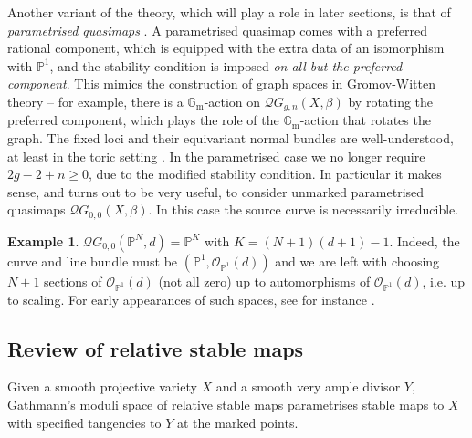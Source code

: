 \documentclass[11pt]{amsart}
\newcommand{\QG}[4]{\mathcal{Q}G_{#1,#2}(#3,#4)}
\newcommand{\PP}{\mathbb P}
\newcommand{\Gm}{\mathbb{G}_{\text{m}}}
\theoremstyle{definition}
\theoremstyle{definition}
\newtheorem{example}[thm]{Example}
\begin{document}
Another variant of the theory, which will play a role in later sections, is that of \emph{parametrised quasimaps} \cite[\S 7]{CF-K}. A parametrised quasimap comes with a preferred rational component, which is equipped with the extra data of an isomorphism with $\PP^1$, and the stability condition is imposed \emph{on all but the preferred component}. This mimics the construction of graph spaces in Gromov-Witten theory -- for example, there is a $\Gm$-action on $\QG{g}{n}{X}{\beta}$ by rotating the preferred component, which plays the role of the $\Gm$-action that rotates the graph. The fixed loci and their equivariant normal bundles are well-understood, at least in the toric setting \cite[\S 7]{CF-K}.  In the parametrised case we no longer require $2g-2+n\geq 0$, due to the modified stability condition. In particular it makes sense, and turns out to be very useful, to consider unmarked parametrised quasimaps $\QG{0}{0}{X}{\beta}$. In this case the source curve is necessarily irreducible. 

\begin{example} $\QG{0}{0}{\PP^N}{d} = \PP^K$ with $K=(N+1)(d+1)-1$. Indeed, the curve and line bundle must be $(\PP^1,\mathcal O_{\PP^1}(d))$ and we are left with choosing $N+1$ sections of $\mathcal O_{\PP^1}(d)$ (not all zero) up to automorphisms of $\mathcal O_{\PP^1}(d)$, i.e. up to scaling. For early appearances of such spaces, see for instance \cite{MorrisonPlesser} \cite{Givental-mirror} \cite{Bertram}.\end{example}

\subsection{Review of relative stable maps} \label{Subsection relative stable maps} Given a smooth projective variety $X$ and a smooth very ample divisor $Y$, Gathmann's moduli space of relative stable maps parametrises stable maps to $X$ with specified tangencies to $Y$ at the marked points.
\end{document}
